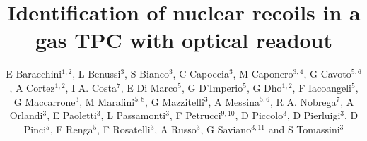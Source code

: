 \documentclass[12pt]{iopart}
\begin{document}
\title[]{Identification of  nuclear recoils in a gas TPC with optical readout}

\newcommand {\ie}{\mbox{i.e.}\xspace}     %
\newcommand {\eg}{\mbox{e.g.}\xspace}     %

\newcommand{\fe}{\ensuremath{^{55}\textrm{Fe}}\xspace}
\newcommand{\abs}[1]{\ensuremath{\vert #1 \vert}}
\newcommand{\ambe}{\ensuremath{\textrm{Am} \textrm{Be}}\xspace}
\newcommand{\isclu}{\ensuremath{I_{SC}}\xspace}
\newcommand{\tsigmag}{\ensuremath{\sigma^T_{Gauss}}\xspace}
\newcommand{\dedl}{\ensuremath{\frac{dE}{dl_p}}\xspace}

\newcommand{\lemon}{{\textsc{Lemon}}\xspace}
\newcommand{\cygno}{{\textsc{Cygno}}\xspace}
\newcommand{\idbscan}{{\textsc{Idbscan}}\xspace}
\newcommand{\dbscan}{{\textsc{dbscan}}\xspace}
\newcommand{\gac}{{\textsc{Gac}}\xspace}
\newcommand{\nnc}{{\textsc{Nnc}}\xspace}
\newcommand{\GEANTfour} {{\textsc{Geant4}}\xspace}
\newcommand{\SRIM} {{\textsc{Srim}}\xspace}
\newcommand{\garfield} {{\textsc{Garfield}}\xspace}
\newcommand{\PYTHONthree} {{\textsc{Python3}}\xspace}
\newcommand{\ROOT} {{\textsc{Root6}}\xspace}

\newcommand{\unit}[1]{\ensuremath{\textrm{\,#1}}\xspace}
\newcommand{\keV}{\ensuremath{\,\textrm{ke\hspace{-.08em}V}}\xspace}
\newcommand{\MeV}{\ensuremath{\,\textrm{Me\hspace{-.08em}V}}\xspace}




\author{E Baracchini$^{1,2}$,
L Benussi$^{3}$,
S Bianco$^{3}$,
C Capoccia$^{3}$, 
M Caponero$^{3,4}$,
G Cavoto$^{5,6}$,
A Cortez$^{1,2}$,
I A. Costa$^{7}$,
E Di Marco$^{5}$,
G D'Imperio$^{5}$,
G Dho$^{1,2}$,
F Iacoangeli$^{5}$,
G Maccarrone$^{3}$,
M Marafini$^{5,8}$,
G Mazzitelli$^{3}$,
A Messina$^{5,6}$,
R A. Nobrega$^{7}$,
A Orlandi$^{3}$,
E Paoletti$^{3}$,
L Passamonti$^{3}$,
F Petrucci$^{9,10}$,
D Piccolo$^{3}$,
D Pierluigi$^{3}$,
D Pinci$^{5}$,
F Renga$^{5}$,
F Rosatelli$^{3}$,
A Russo$^{3}$,
G Saviano$^{3,11}$
and S Tomassini$^{3}$}
\end{document}
